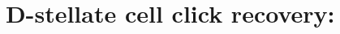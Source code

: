 


% 

% 








% 
\graphicspath{{/media/data/Work/cnstellate/DS_ClickRecovery/}{/media/data/Work/Responses/}}
\section{D-stellate cell click recovery: }

